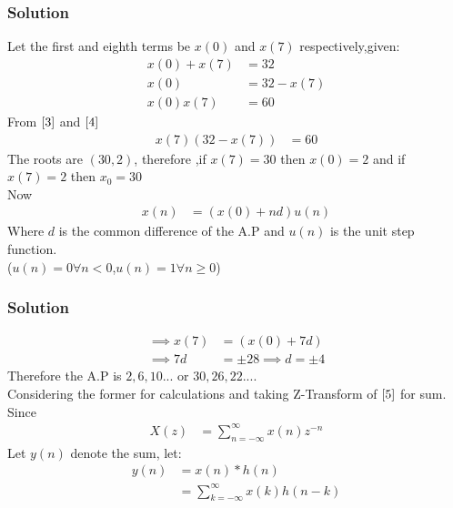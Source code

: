 \documentclass{beamer}
\providecommand{\brak}[1]{\ensuremath{\left(#1\right)}}
\theoremstyle{remark}
\begin{document}
\begin{frame}
\frametitle{Solution}
Let the first and eighth terms be $x\brak{0}$ and $x\brak{7}$ respectively,given:
\begin{align}
x\brak{0}+x\brak{7} &= 32\\
x\brak{0} &= 32 - x\brak{7}\label{3} \\
x\brak{0}x\brak{7} &= 60 \label{4}
\end{align}
From $\eqref{3}$ and $\eqref{4}$
\begin{align}
    x\brak{7}\brak{32-x\brak{7}} &= 60
\end{align}
The roots are $\brak{30,2}$, therefore ,if $x\brak{7}=30$ then $x\brak{0}=2$ and if $x\brak{7}=2$ then $x_0=30$\\
Now
\begin{align}
    x\brak{n} &= \brak{x\brak{0} + nd}u\brak{n}\label{5}
    \end{align}
    Where $d$ is the common difference of the A.P and $u(n)$ is the unit step function.\\($u\brak{n}=0 \forall n<0$,$u\brak{n}=1 \forall n\geq0$)
\end{frame}






\begin{frame}
\frametitle{Solution}
\begin{align}
        \implies     x\brak{7} &= \brak{x\brak{0} + 7d}\\
    \implies 7d &= \pm 28 \implies d = \pm 4
\end{align}
Therefore the A.P is $2,6,10...$ or $30,26,22...$.\\
Considering the former for calculations and taking Z-Transform of $\eqref{5}$ for sum.\\
Since
\begin{align}
X(z) &= \sum_{n=-\infty}^{\infty} x(n)z^{-n} \label{6}
\end{align}
Let $y\brak{n}$ denote the sum, let:
\begin{align}
    y\brak{n} &= x\brak{n} * h\brak{n}\\
    &= \sum_{k=-\infty}^{\infty} x(k)h(n-k)
\end{align}    
\end{frame}
\end{document}
